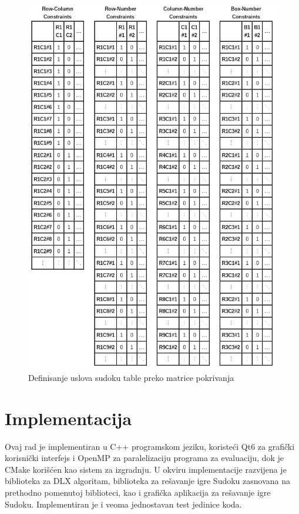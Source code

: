 \documentclass[a4paper]{article}
\begin{document}
{\begin{figure}[h!]
  \begin{center}
  \includegraphics[scale=0.325]{slike/sudoku.png}
  \end{center}
  \caption{Definisanje uslova sudoku table preko matrice pokrivanja \cite{exact_cover_matrix}}
  \label{fig:tabla}
\end{figure}

\section{Implementacija}

Ovaj rad je implementiran u C++ programskom jeziku, koristeći Qt6 za grafički korisnički interfejs i OpenMP za paralelizaciju 
programa za evaluaciju, dok je CMake korišćen
kao sistem za izgradnju. U okviru implementacije razvijena je biblioteka za DLX algoritam, biblioteka za rešavanje igre Sudoku
zasnovana na prethodno pomenutoj biblioteci, kao i grafička aplikacija za rešavanje igre Sudoku. Implementiran je i veoma
jednostavan test jedinice koda.

}
\end{document}

